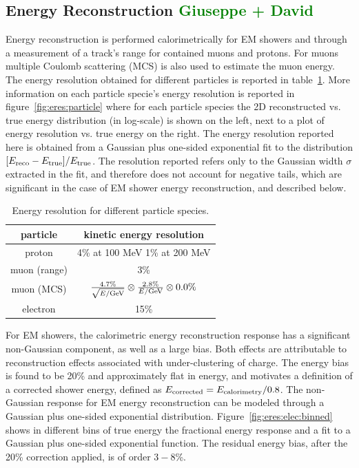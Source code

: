 \documentclass[a4paper]{article}
\begin{document}
\newpage

\subsection{Energy Reconstruction \textcolor{green}{Giuseppe + David}}
\label{sec:ereco}
\par Energy reconstruction is performed calorimetrically for EM showers and through a measurement of a track's range for contained muons and protons. For muons multiple Coulomb scattering (MCS) is also used to estimate the muon energy. The energy resolution obtained for different particles is reported in table~\ref{tab:eres}. More information on each particle specie's energy resolution is reported in figure~\ref{fig:eres:particle} where for each particle species the 2D reconstructed vs. true energy distribution (in log-scale) is shown on the left, next to a plot of energy resolution vs. true energy on the right. The energy resolution reported here is obtained from a Gaussian plus one-sided exponential fit to the distribution $[E_{\rm reco}-E_{\rm true}] / E_{\rm true}$. The resolution reported refers only to the Gaussian width $\sigma$ extracted in the fit, and therefore does not account for negative tails, which are significant in the case of EM shower energy reconstruction, and described below.


\begin{table}[H]
\centering
  \begin{tabular}{ | c | c |  }
    \hline
    particle & kinetic energy resolution  \\ \hline
    proton & 4\% at 100 MeV 1\% at 200 MeV \\ \hline
    muon (range) & 3\%  \\ \hline
    muon (MCS) & $\frac{4.7\%}{\sqrt{E/{\rm GeV}}} \otimes \frac{2.8\%}{E/{\rm GeV}} \otimes 0.0\%$  \\ \hline
    electron & 15\%  \\
    \hline
    
  \end{tabular}
  \caption{\label{tab:eres} Energy resolution for different particle species.}
 \end{table}
 
 \par For EM showers, the calorimetric energy reconstruction response has a significant non-Gaussian component, as well as a large bias. Both effects are attributable to reconstruction effects associated with under-clustering of charge. The energy bias is found to be 20\% and approximately flat in energy, and motivates a definition of a corrected shower energy, defined as $E_{\rm corrected} = E_{\rm calorimetry} / 0.8$. The non-Gaussian response for EM energy reconstruction can be modeled through a Gaussian plus one-sided exponential distribution. Figure~\ref{fig:eres:elec:binned} shows in different bins of true energy the fractional energy response and a fit to a Gaussian plus one-sided exponential function. The residual energy bias, after the 20\% correction applied, is of order $3-8$\%. 
 
\end{document}

